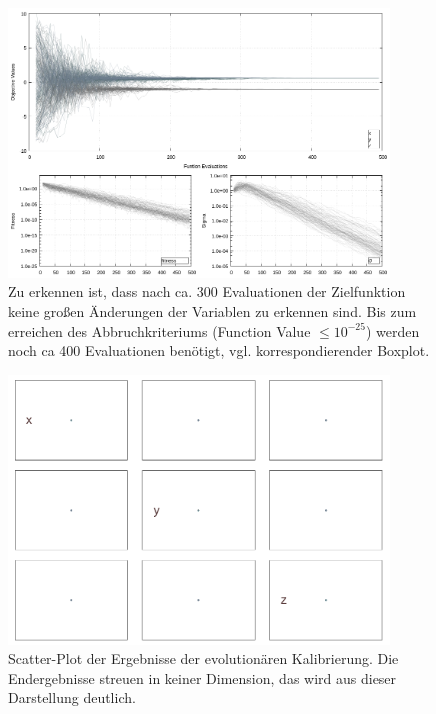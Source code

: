 \begin{figure}[!ht]
  \begin{center}
    \caption[Linien-Plot der Endergebnisse der Kalibierung]{Zu erkennen ist, dass nach ca. 300 Evaluationen der Zielfunktion keine großen Änderungen der Variablen zu erkennen sind. Bis zum erreichen des Abbruchkriteriums (Function Value $\leq10^{-25}$) werden noch ca 400 Evaluationen benötigt, vgl. korrespondierender Boxplot.}
    \label{fig:Final_Calibration_Ant0_ES-Lines}  
    \includegraphics[width=0.9\textwidth]{img/calibration/calibration_ant0-lines.png}
  \end{center}
%  
\end{figure}
%
\begin{figure}[!ht]
  \begin{center}
  
    \caption[Kalibierung Scatter-Plot]{Scatter-Plot der Ergebnisse der evolutionären Kalibrierung. Die Endergebnisse streuen in keiner Dimension, das wird aus dieser Darstellung deutlich.}
    \label{fig:Final_Calibration_Ant0_ES-Scatter}  
    \includegraphics[width=0.9\textwidth]{img/calibration/calibration_ant0-scatter.png}
  \end{center}
%  
\end{figure}
